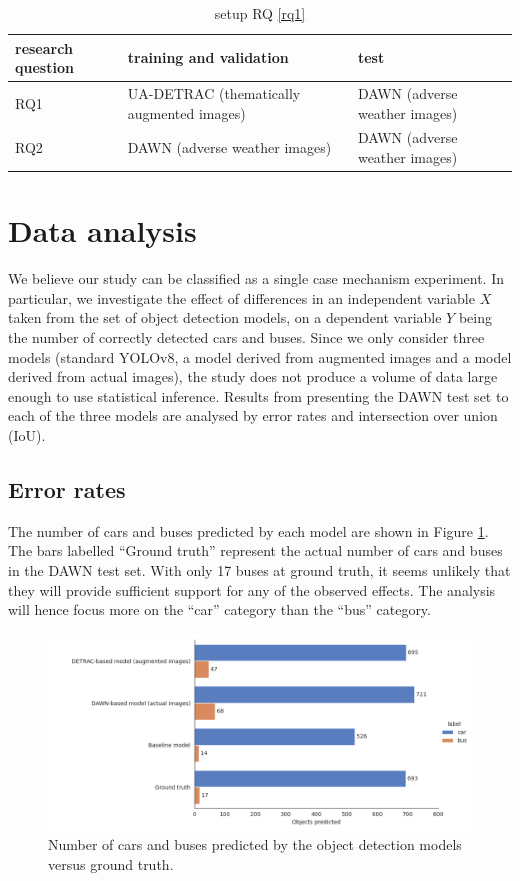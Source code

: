 \documentclass[]{article}
\begin{document}
\begin{table}[H]
	\centering
	\begin{tabular}{lll}
		\toprule
		\textbf{research question} & \textbf{training and validation} & \textbf{test} \\
		\midrule
		RQ1 & UA-DETRAC (thematically augmented images) & DAWN (adverse weather images) \\
		RQ2 & DAWN (adverse weather images) & DAWN (adverse weather images) \\
		\bottomrule
	\end{tabular}
	\caption{setup RQ \ref{rq1}}
	\label{table:setuprq}
\end{table}
\section{Data analysis}

	We believe our study can be classified as a single case mechanism experiment. In particular, we investigate the effect of differences in an independent variable $X$ taken from the set of object detection models, on a dependent variable $Y$ being the number of correctly detected cars and buses. Since we only consider three models (standard YOLO{\small v8}, a model derived from augmented images and a model derived from actual images), the study does not produce a volume of data large enough to use statistical inference. Results from presenting the DAWN test set to each of the three models are analysed by error rates and intersection over union (IoU).
	
\subsection{Error rates}
	
	The number of cars and buses predicted by each model are shown in Figure \ref{fig:counts}. The bars labelled ``Ground truth'' represent the actual number of cars and buses in the DAWN test set. With only 17 buses at ground truth, it seems unlikely that they will provide sufficient support for any of the observed effects. The analysis will hence focus more on the ``car'' category than the ``bus'' category.  
	
	\begin{figure}[h]
		\centering
		\includegraphics[width=120mm]{objectPredictionCounts.png}
		\caption{Number of cars and buses predicted by the object detection models versus ground truth.}
		\label{fig:counts}
	\end{figure}
\end{document}

